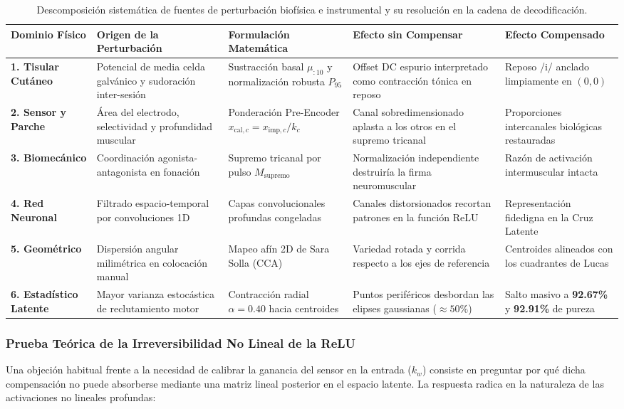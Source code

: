 \documentclass[11pt,a4paper]{article}
\begin{document}
\begin{table}[H]
\centering
\small
\begin{tabularx}{\textwidth}{p{2.2cm}p{3.2cm}p{3.0cm}p{3.8cm}p{2.6cm}}
\toprule
\textbf{Dominio Físico} & \textbf{Origen de la Perturbación} & \textbf{Formulación Matemática} & \textbf{Efecto sin Compensar} & \textbf{Efecto Compensado} \\
\midrule
\textbf{1. Tisular Cutáneo} & Potencial de media celda galvánico y sudoración inter-sesión & Sustracción basal $\mu_{:10}$ y normalización robusta $P_{95}$ & Offset DC espurio interpretado como contracción tónica en reposo & Reposo /i/ anclado limpiamente en $(0,0)$ \\
\midrule
\textbf{2. Sensor y Parche} & Área del electrodo, selectividad y profundidad muscular & Ponderación Pre-Encoder $x_{\text{cal}, c} = x_{\text{imp}, c} / k_c$ & Canal sobredimensionado aplasta a los otros en el supremo tricanal & Proporciones intercanales biológicas restauradas \\
\midrule
\textbf{3. Biomecánico} & Coordinación agonista-antagonista en fonación & Supremo tricanal por pulso $M_{\text{supremo}}$ & Normalización independiente destruiría la firma neuromuscular & Razón de activación intermuscular intacta \\
\midrule
\textbf{4. Red Neuronal} & Filtrado espacio-temporal por convoluciones 1D & Capas convolucionales profundas congeladas & Canales distorsionados recortan patrones en la función $\text{ReLU}$ & Representación fidedigna en la Cruz Latente \\
\midrule
\textbf{5. Geométrico} & Dispersión angular milimétrica en colocación manual & Mapeo afín 2D de Sara Solla (CCA) & Variedad rotada y corrida respecto a los ejes de referencia & Centroides alineados con los cuadrantes de Lucas \\
\midrule
\textbf{6. Estadístico Latente} & Mayor varianza estocástica de reclutamiento motor & Contracción radial $\alpha = 0.40$ hacia centroides & Puntos periféricos desbordan las elipses gaussianas ($\approx 50\%$) & Salto masivo a \textbf{92.67\%} y \textbf{92.91\%} de pureza \\
\bottomrule
\end{tabularx}
\caption{Descomposición sistemática de fuentes de perturbación biofísica e instrumental y su resolución en la cadena de decodificación.}
\label{tab:descomposicion_biofisica_cadena}
\end{table}

\subsubsection{Prueba Teórica de la Irreversibilidad No Lineal de la ReLU}
Una objeción habitual frente a la necesidad de calibrar la ganancia del sensor en la entrada ($k_w$) consiste en preguntar por qué dicha compensación no puede absorberse mediante una matriz lineal posterior en el espacio latente. La respuesta radica en la naturaleza de las activaciones no lineales profundas:
\end{document}
